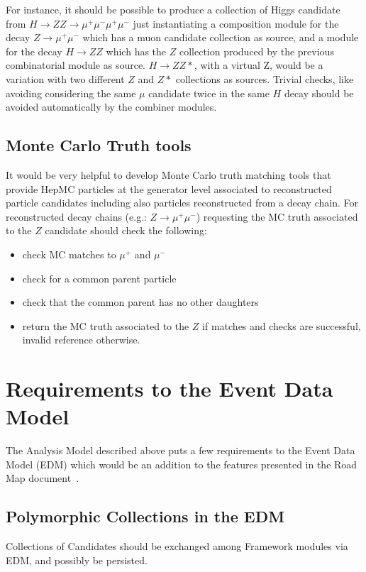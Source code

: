 \documentclass[draftmode]{memarticle}
\begin{document}
For instance, it should be possible to produce
a collection of Higgs candidate from  
$H\rightarrow Z Z\rightarrow \mu^+\mu^-\mu^+\mu^-$
just instantiating a composition module for the 
decay $Z\rightarrow \mu^+\mu^-$ which has a muon 
candidate collection as source, and a module
for the decay $H\rightarrow Z Z$ which has 
the $Z$ collection produced by the previous 
combinatorial module as source. $H\rightarrow Z Z*$,
with a virtual Z, would be a variation with two 
different $Z$ and $Z*$ collections as sources.
Trivial checks, like avoiding considering 
the same $\mu$ candidate twice in the same $H$ decay
should be avoided automatically by the combiner modules.

\section{Monte Carlo Truth tools}

It would be very helpful to develop Monte Carlo truth 
matching tools that provide HepMC particles at the generator
level associated to reconstructed particle candidates including
also particles reconstructed from a decay chain.
For reconstructed decay chains (e.g.: $Z\rightarrow\mu^+\mu^-$)
requesting the MC truth associated to the $Z$ candidate 
should check the following:
\begin{itemize}
\item check MC matches to $\mu^+$ and $\mu^-$
\item check for a common parent particle
\item check that the common parent has no other daughters
\item return the MC truth associated to the $Z$ if
matches and checks are successful, invalid reference 
otherwise.
\end{itemize}

\chapter{Requirements to the Event Data Model}
\label{sec:edm}
The Analysis Model described above puts a few requirements 
to the Event Data Model (EDM) which would be an addition to the
features presented in the Road Map document~\cite{roadmap}.

\section{Polymorphic Collections in the EDM}
Collections of Candidates should be exchanged among Framework
modules via EDM, and possibly be persisted.
\end{document}
